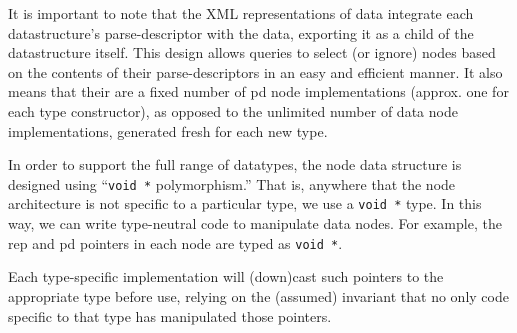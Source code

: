{It is important to note that the XML representations of \pads{} data
integrate each datastructure's parse-descriptor with the data,
exporting it as a child of the datastructure itself. This design
allows queries to select (or ignore) nodes based on the contents of
their parse-descriptors in an easy and efficient manner. It also means
that their are a fixed number of pd node implementations (approx. one for
each type constructor), as opposed to the unlimited number of data
node implementations, generated fresh for each new \pads{} type.

In order to support the full range of \pads{} datatypes,
the node data structure is designed using ``{\tt void *}
polymorphism.'' That is, anywhere that the node architecture is not
specific to a particular type, we use a {\tt void *} type. In this
way, we can write type-neutral code to manipulate data nodes. For
example, the rep and pd pointers in each node are typed as {\tt void
  *}. 

Each type-specific implementation will (down)cast such pointers to the
appropriate type before use, relying on the (assumed) invariant that
no only code specific to that type has manipulated those pointers.
}
